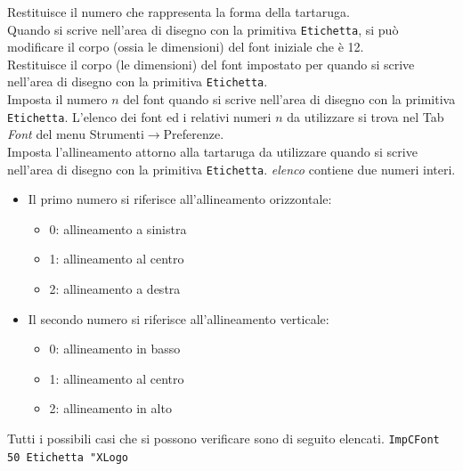 Restituisce il numero che rappresenta la forma della tartaruga.\\
Quando si scrive nell'area di disegno con la primitiva \texttt{Etichetta}, si può modificare il corpo (ossia le dimensioni) del font iniziale che è 12.\\
Restituisce il corpo (le dimensioni) del font impostato per quando si scrive nell'area di disegno con la primitiva  \texttt{Etichetta}.\\
Imposta il numero $n$ del font quando si scrive nell'area di disegno con la primitiva \texttt{Etichetta}. L'elenco dei font ed i relativi numeri $n$ da utilizzare si trova nel Tab \textit{Font} del menu Strumenti$\to$Preferenze.\\
Imposta l'allineamento attorno alla tartaruga da utilizzare quando si scrive nell'area di disegno con la primitiva \texttt{Etichetta}. \textit{elenco} contiene due numeri interi.
\begin{itemize}
 \item Il primo numero si riferisce all'allineamento orizzontale:
	\begin{itemize}
 	\item 0: allineamento a sinistra
	\item 1: allineamento al centro
	\item 2: allineamento a destra
	\end{itemize}
 \item Il secondo numero si riferisce all'allineamento verticale:
	\begin{itemize}
 	\item 0: allineamento in basso
	\item 1: allineamento al centro
	\item 2: allineamento in alto
	\end{itemize}
\end{itemize}
Tutti i possibili casi che si possono verificare sono di seguito elencati.
\texttt{ImpCFont 50 Etichetta "XLogo}
